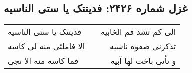 \begin{center}
\section*{غزل شماره ۲۴۲۶: فدیتتک یا ستی الناسیه}
\label{sec:2426}
\begin{longtable}{l p{0.5cm} r}
فدیتتک یا ستی الناسیه
&&
الی کم تشد فم الخابیه
\\
الا فاملئی منه لی کاسه
&&
تذکرنی صفوه ناسیه
\\
فما کاسه منه الا نجی
&&
و تأتی باخت لها آبیه
\\
\end{longtable}
\end{center}

